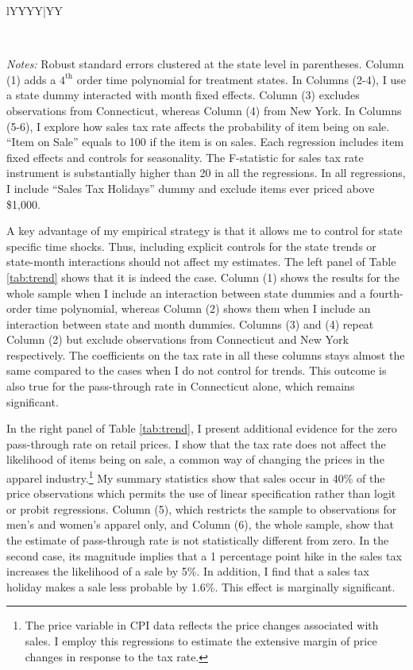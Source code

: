 \documentclass[12pt]{article}
\begin{document}
\begin{table}[t]
\begin{threeparttable}
\begin{tabularx}{\textwidth}{lYYYY|YY}
				
				 \\ 
				
			\end{tabularx}
			\begin{tablenotes}
			\small \emph{Notes:} Robust standard errors clustered at the state level in parentheses. Column (1) adds a $4^{\text{th}}$ order time polynomial for treatment states. In Columns (2-4), I use a state dummy interacted with month fixed effects. Column (3) excludes observations from Connecticut, whereas Column (4) from New York. In Columns (5-6), I explore how sales tax rate affects the probability of item being on sale. ``Item on Sale'' equals to 100 if the item is on sales. Each regression includes item fixed effects and controls for seasonality. The F-statistic for sales tax rate instrument is substantially higher than 20 in all the regressions. In all regressions, I include ``Sales Tax Holidays'' dummy and exclude items ever priced above \$1,000.
			\end{tablenotes}
		\end{threeparttable}
	\end{table}
	
	
	A key advantage of my empirical strategy is that it allows me to control for state specific time shocks. Thus, including explicit controls for the state trends or state-month interactions should not affect my estimates. The left panel of Table \ref{tab:trend} shows that it is indeed the case. Column (1) shows the results for the whole sample when I include an interaction between state dummies and a fourth-order time polynomial, whereas Column (2) shows them when I include an interaction between state and month dummies. Columns (3) and (4) repeat Column (2) but exclude observations from Connecticut and New York respectively. The coefficients on the tax rate in all these columns stays almost the same compared to the cases when I do not control for trends. This outcome is also true for the pass-through rate in Connecticut alone, which remains significant.
	
	In the right panel of Table \ref{tab:trend}, I present additional evidence for the zero pass-through rate on retail prices. I show that the tax rate does not affect the likelihood of items being on sale, a common way of changing the prices in the apparel industry.\footnote{The price variable in CPI data reflects the price changes associated with sales. I employ this regressions to estimate the extensive margin of price changes in response to the tax rate.} My summary statistics show that sales occur in 40\% of the price observations which permits the use of linear specification rather than logit or probit regressions. Column (5), which restricts the sample to observations for men's and women's apparel only, and Column (6), the whole sample, show that the estimate of pass-through rate is not statistically different from zero. In the second case, its magnitude implies that a 1 percentage point hike in the sales tax increases the likelihood of a sale by 5\%. In addition, I find that a sales tax holiday makes a sale less probable by 1.6\%. This effect is marginally significant.
	
\end{document}
